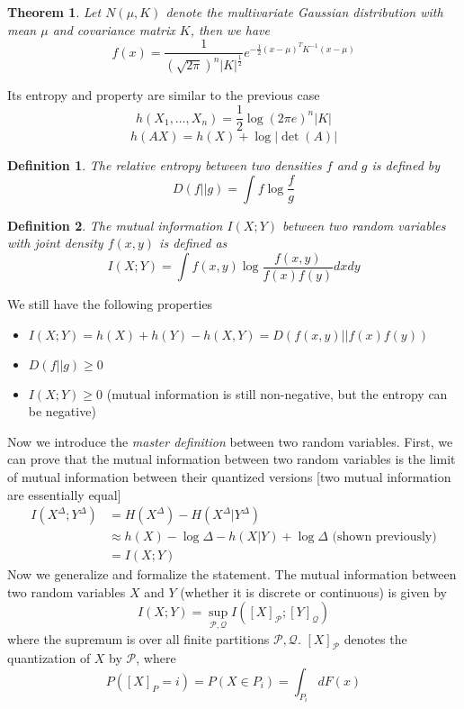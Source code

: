 \documentclass[10pt,landscape, a4paper]{article}
\newtheorem{definition}{Definition}
\newtheorem{theorem}{Theorem}
\begin{document}
\begin{multicols}{3}
\begin{theorem}
    Let $N(\mu, K)$ denote the multivariate Gaussian distribution with mean $\mu$ and covariance matrix $K$, then we have
    $$
    f(x)=\frac{1}{(\sqrt{2\pi})^{n}|K|^{\frac{1}{2}}}e^{-\frac{1}{2}(x-\mu)^TK^{-1}(x-\mu)}
    $$
\end{theorem}

Its entropy and property are similar to the previous case
$$
h(X_1,\dots, X_n)=\frac{1}{2}\log (2\pi e)^n|K|
$$
$$
h(AX)=h(X)+\log|\det(A)|
$$

\begin{definition}
    The relative entropy between two densities $f$ and $g$ is defined by
$$
D(f||g)=\int f\log\frac{f}{g}
$$
\end{definition}

\begin{definition}
    The mutual information $I(X;Y)$ between two random variables with joint density $f(x,y)$ is defined as
    $$
    I(X;Y)=\int f(x,y)\log \frac{f(x,y)}{f(x)f(y)}dxdy
    $$
\end{definition}

We still have the following properties

\begin{itemize}
    \item $I(X;Y)=h(X)+h(Y)-h(X,Y)=D(f(x,y)||f(x)f(y))$
    \item $D(f||g)\ge 0$
    \item $I(X;Y)\ge 0$ (mutual information is still non-negative, but the entropy can be negative)
\end{itemize}

Now we introduce the \textit{master definition} between two random variables. First, we can prove that the mutual information between two random variables is the limit of mutual information between their quantized versions [two mutual information are essentially equal]
$$
\begin{aligned}
I(X^\Delta;Y^\Delta)&=H(X^\Delta)-H(X^\Delta|Y^\Delta)\\
&\approx h(X)-\log \Delta-h(X|Y)+\log \Delta\text{ (shown previously)}\\
&=I(X;Y)
\end{aligned}
$$
Now we generalize and formalize the statement. The mutual information between two random variables $X$ and $Y$ (whether it is discrete or continuous) is given by
$$
I(X;Y)=\sup_{\mathcal{P,Q}} I([X]_\mathcal{P};[Y]_{\mathcal{Q}})
$$
where the supremum is over all finite partitions $\mathcal{P},\mathcal{Q}$. $[X]_{\mathcal{P}}$ denotes the quantization of $X$ by $\mathcal{P}$, where
$$
P([X]_P=i)=P(X\in P_i)=\int_{P_i}dF(x)
$$


\end{multicols}
\end{document}
